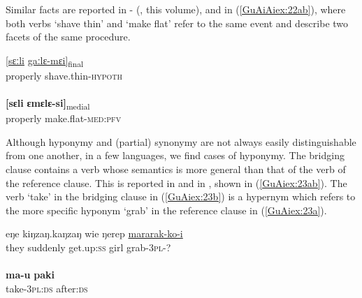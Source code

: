\documentclass[output=paper]{LSP/langsci}
\begin{document}
Similar facts are reported in - (\citeauthor{emlen18}, this volume),  \citep{Pennington2015} and  in (\ref{GuAiAiex:22ab}), where both verbs `shave thin' and `make flat' refer to the same event and describe two facets of the same procedure. 


\begin{exe}
\ex \label{GuAiAiex:22ab}
\begin{xlist}
\ex \label{GuAiAiex:22a}
\gll \underline{[sɛːli}	\underline{gaːlɛ-mɛi]}\textsubscript{final}\\
properly	shave.thin-\textsc{hypoth}\\
\glt {}\\
\ex \label{GuAiAiex:22b}
\gll \textbf{[sɛli}	\textbf{ɛmɛlɛ-si]}\textsubscript{medial}\\
properly	make.flat-\textsc{med}:\textsc{pfv}\\
\glt {}
\end{xlist}
\end{exe}




Although hyponymy and (partial) synonymy are not always easily distinguishable from one another, in a few languages, we find cases of hyponymy. The bridging clause contains a verb whose semantics is more general than that of the verb of the reference clause. This is reported in  \citep[][151]{kleef88} and in , shown in (\ref{GuAiex:23ab}). The verb `take' in the bridging clause in (\ref{GuAiex:23b}) is a hypernym which refers to the more specific hyponym `grab' in the reference clause in (\ref{GuAiex:23a}).

\begin{exe}
\ex \label{GuAiex:23ab}
\begin{xlist}
\ex \label{GuAiex:23a}
\gll eŋe  kiŋzaŋ.kaŋzaŋ  wie     ŋerep   \underline{mararak-ko-i}\\
they  suddenly  get.up:\textsc{ss}   girl   grab-\textsc{3pl}-?\\
\glt {} \\
\ex \label{GuAiex:23b}
\gll  \textbf{ma-u}    \textbf{paki}\\
take-\textsc{3pl:ds}   after:\textsc{ds} \\
\glt {}
\end{xlist}
\end{exe}
\end{document}
